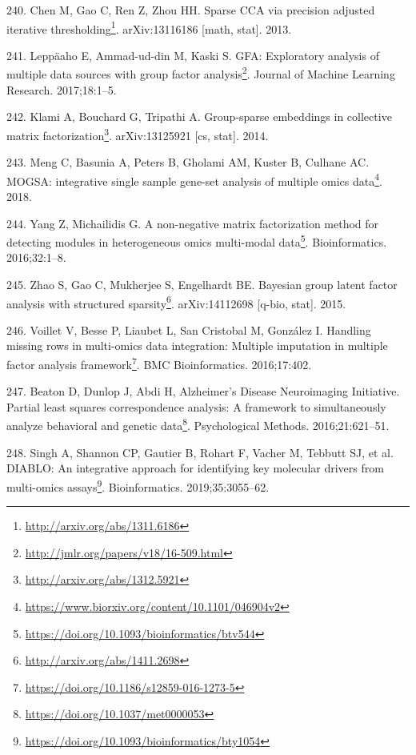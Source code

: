 \documentclass[
  a4paper,
]{book}
\DeclareRobustCommand{\href}[2]{#2\footnote{\url{#1}}}
\newlength{\cslhangindent}
\newlength{\cslentryspacingunit} %
\newenvironment{CSLReferences}[2] %
 {%
  \setlength{\parindent}{0pt}
  \ifodd #1
  \let\oldpar\par
  \def\par{\hangindent=\cslhangindent\oldpar}
  \fi
  \setlength{\parskip}{#2\cslentryspacingunit}
 }%
 {}
\begin{document}
\begin{CSLReferences}{0}{0}
\leavevmode{}%
240. Chen M, Gao C, Ren Z, Zhou HH. \href{http://arxiv.org/abs/1311.6186}{Sparse CCA via precision adjusted iterative thresholding}. arXiv:13116186 {[}math, stat{]}. 2013.

\leavevmode{}%
241. Leppäaho E, Ammad-ud-din M, Kaski S. \href{http://jmlr.org/papers/v18/16-509.html}{GFA: Exploratory analysis of multiple data sources with group factor analysis}. Journal of Machine Learning Research. 2017;18:1--5.

\leavevmode{}%
242. Klami A, Bouchard G, Tripathi A. \href{http://arxiv.org/abs/1312.5921}{Group-sparse embeddings in collective matrix factorization}. arXiv:13125921 {[}cs, stat{]}. 2014.

\leavevmode{}%
243. Meng C, Basunia A, Peters B, Gholami AM, Kuster B, Culhane AC. \href{https://www.biorxiv.org/content/10.1101/046904v2}{MOGSA: integrative single sample gene-set analysis of multiple omics data}. 2018.

\leavevmode{}%
244. Yang Z, Michailidis G. \href{https://doi.org/10.1093/bioinformatics/btv544}{A non-negative matrix factorization method for detecting modules in heterogeneous omics multi-modal data}. Bioinformatics. 2016;32:1--8.

\leavevmode{}%
245. Zhao S, Gao C, Mukherjee S, Engelhardt BE. \href{http://arxiv.org/abs/1411.2698}{Bayesian group latent factor analysis with structured sparsity}. arXiv:14112698 {[}q-bio, stat{]}. 2015.

\leavevmode{}%
246. Voillet V, Besse P, Liaubet L, San Cristobal M, González I. \href{https://doi.org/10.1186/s12859-016-1273-5}{Handling missing rows in multi-omics data integration: Multiple imputation in multiple factor analysis framework}. BMC Bioinformatics. 2016;17:402.

\leavevmode{}%
247. Beaton D, Dunlop J, Abdi H, Alzheimer's Disease Neuroimaging Initiative. \href{https://doi.org/10.1037/met0000053}{Partial least squares correspondence analysis: A framework to simultaneously analyze behavioral and genetic data}. Psychological Methods. 2016;21:621--51.

\leavevmode{}%
248. Singh A, Shannon CP, Gautier B, Rohart F, Vacher M, Tebbutt SJ, et al. \href{https://doi.org/10.1093/bioinformatics/bty1054}{DIABLO: An integrative approach for identifying key molecular drivers from multi-omics assays}. Bioinformatics. 2019;35:3055--62.


\end{CSLReferences}
\end{document}

